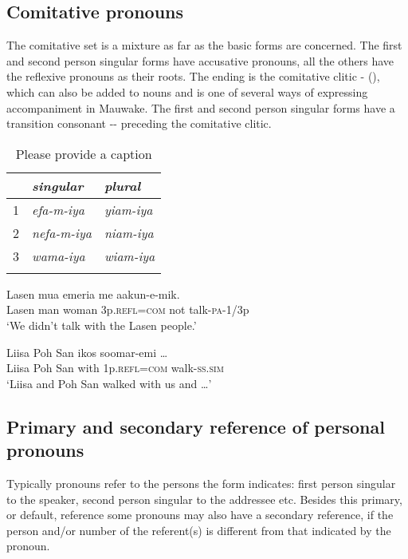 \subsection{Comitative pronouns}\label{sec:3.5.9}
{}
The comitative set is a mixture as far as the basic forms are concerned. The first and second person singular forms have accusative pronouns, all the others have the reflexive pronouns as their roots. The ending is the comitative clitic - (), which can also be added to nouns and is one of several ways of expressing accompaniment in Mauwake. The first and second person singular forms have a transition consonant -- preceding the comitative clitic.

\begin{table}
\caption{Please provide a caption}
\label{} 
\begin{tabular}{l>{\itshape}l>{\itshape}l}
\mytoprule
 &\upshape singular &\upshape plural\\
\midrule
1 &efa-m-iya &yiam-iya\\
2 &nefa-m-iya &niam-iya\\
3 &wama-iya &wiam-iya\\
\mybottomrule
\end{tabular}
\end{table}


\ea%
\label{ex:3:x619}
\gll Lasen mua emeria  me aakun-e-mik. \\
Lasen man woman 3p.\textsc{refl}=\textsc{com} not talk-\textsc{pa}-1/3p\\
\glt`We didn't talk with the Lasen people.'
\z

\ea%
\label{ex:3:x620}
\gll Liisa Poh San ikos  soomar-emi {\dots} \\
Liisa Poh San with 1p.\textsc{refl}=\textsc{com} walk-\textsc{ss}.\textsc{sim}\\
\glt`Liisa and Poh San walked with us and {\dots}'
\z

\subsection{Primary and secondary reference of personal pronouns}\label{sec:3:y:x}
{}
Typically pronouns refer to the persons the form indicates: first person singular to the speaker, second person singular to the addressee etc. Besides this primary, or default, reference some pronouns may also have a secondary reference, if the person and/or number of the referent(s) is different from that indicated by the pronoun.

